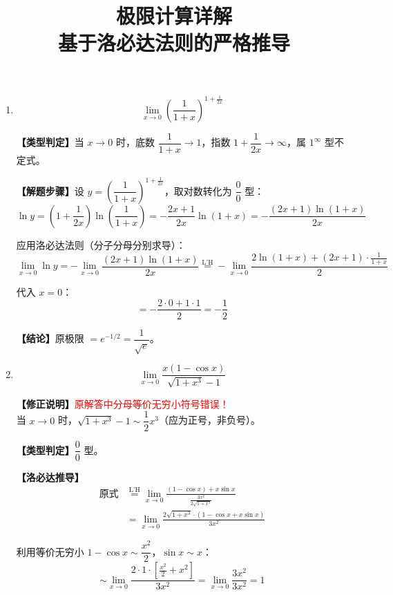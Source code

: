\documentclass[12pt, a4paper]{ctexart}
\title{\textbf{极限计算详解}\\ \large 基于洛必达法则的严格推导}
\author{}
\date{}
\newcommand{\lqq}{\left(}
\newcommand{\rqq}{\right)}
\newcommand{\lbb}{\left[}
\newcommand{\rbb}{\right]}
\newcommand{\lh}{\stackrel{\text{L'H}}{=}}  %
\begin{document}
\maketitle

\begin{enumerate}[label=\textbf{\Large 第\arabic*题}, leftmargin=0pt, itemsep=2em]

\item 
\begin{tcolorbox}[colback=gray!5,colframe=gray!50!black,title=原题]
\[
\lim_{x \to 0} \left( \frac{1}{1+x} \right)^{1+\frac{1}{2x}}
\]
\end{tcolorbox}

\textbf{【类型判定】}当 $x \to 0$ 时，底数 $\dfrac{1}{1+x} \to 1$，指数 $1+\dfrac{1}{2x} \to \infty$，属 $1^{\infty}$ 型不定式。

\textbf{【解题步骤】}设 $y = \lqq \dfrac{1}{1+x} \rqq^{1+\frac{1}{2x}}$，取对数转化为 $\dfrac{0}{0}$ 型：
\[
\ln y = \left(1+\frac{1}{2x}\right)\ln\left(\frac{1}{1+x}\right) = -\frac{2x+1}{2x}\ln(1+x) = -\frac{(2x+1)\ln(1+x)}{2x}
\]

应用洛必达法则（分子分母分别求导）：
\[
\lim_{x \to 0} \ln y = -\lim_{x \to 0} \frac{(2x+1)\ln(1+x)}{2x} 
\lh -\lim_{x \to 0} \frac{2\ln(1+x) + (2x+1)\cdot\frac{1}{1+x}}{2}
\]

代入 $x = 0$：
\[
= -\frac{2\cdot 0 + 1\cdot 1}{2} = -\frac{1}{2}
\]

\textbf{【结论】}原极限 $= e^{-1/2} = \dfrac{1}{\sqrt{e}}$。

\item 
\begin{tcolorbox}[colback=gray!5,colframe=gray!50!black,title=原题]
\[
\lim_{x \to 0} \frac{x(1-\cos x)}{\sqrt{1+x^3}-1}
\]
\end{tcolorbox}

\textbf{【修正说明】}\textcolor{red}{原解答中分母等价无穷小符号错误！}\\
当 $x \to 0$ 时，$\sqrt{1+x^3}-1 \sim \dfrac{1}{2}x^3$（应为正号，非负号）。

\textbf{【类型判定】}$\dfrac{0}{0}$ 型。

\textbf{【洛必达推导】}
\begin{align*}
\text{原式} &\lh \lim_{x \to 0} \frac{(1-\cos x) + x\sin x}{\frac{3x^2}{2\sqrt{1+x^3}}} \\
&= \lim_{x \to 0} \frac{2\sqrt{1+x^3}\cdot(1-\cos x + x\sin x)}{3x^2}
\end{align*}

利用等价无穷小 $1-\cos x \sim \dfrac{x^2}{2}$，$\sin x \sim x$：
\[
\sim \lim_{x \to 0} \frac{2\cdot 1 \cdot \lbb \frac{x^2}{2} + x^2 \rbb}{3x^2} = \lim_{x \to 0} \frac{3x^2}{3x^2} = \boxed{1}
\]


\end{enumerate}
\end{document}

